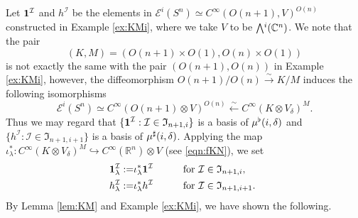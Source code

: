 Let ${\bf{1}}^{\mathcal{I}}$ and $h^{\mathcal{I}}$ be the elements
 in ${\mathcal{E}}^i(S^n) \simeq C^{\infty}(O(n+1),V)^{O(n)}$
 constructed in Example \ref{ex:KMi}, 
 where we take $V$ to be $\Exterior^i({\mathbb{C}}^n)$.  
We note that the pair
\[
   (K,M) = (O(n+1) \times O(1), O(n) \times O(1))
\]
is not exactly the same with the pair
 $(O(n+1), O(n))$ 
 in Example \ref{ex:KMi}, 
however, 
 the diffeomorphism
 $O(n+1)/O(n) \overset \sim \to K/M$
 induces the following isomorphisms
\[
   {\mathcal{E}}^i(S^n)
  \simeq
   C^{\infty}(O(n+1) \otimes V)^{O(n)} \overset \sim \leftarrow
  C^{\infty}(K \otimes V_{\delta})^M.  
\]
Thus we may regard that 
 $\{{\bf{1}}^{\mathcal{I}}: {\mathcal{I}} \in {\mathfrak{I}}_{n+1,i}\}$
 is a basis of $\mu^{\flat} (i,\delta)$
 and 
 $\{h ^{\mathcal{I}}: {\mathcal{I}} \in {\mathfrak{I}}_{n+1,i+1}\}$
 is a basis of $\mu^{\sharp} (i,\delta)$.  
Applying the map
 $\iota_{\lambda}^{\ast} \colon C^{\infty}(K \otimes V_{\delta})^M 
 \hookrightarrow 
 C^{\infty}({\mathbb{R}}^n) \otimes V$ 
 (see \eqref{eqn:fKN}), 
 we set
\begin{alignat*}{2}
{\bf{1}}_{\lambda}^{\mathcal{I}}:=& \iota_{\lambda}^{\ast} {\bf{1}}^{\mathcal{I}}
\qquad
&&\text{for ${\mathcal{I}} \in {\mathfrak{I}}_{n+1,i}$, }
\\
h_{\lambda}^{\mathcal{I}}:=& \iota_{\lambda}^{\ast} h^{\mathcal{I}}
\qquad
&&\text{for ${\mathcal{I}} \in {\mathfrak{I}}_{n+1,i+1}$.  }
\end{alignat*}
By Lemma \ref{lem:KM}
 and Example \ref{ex:KMi}, 
 we have shown the following.  


